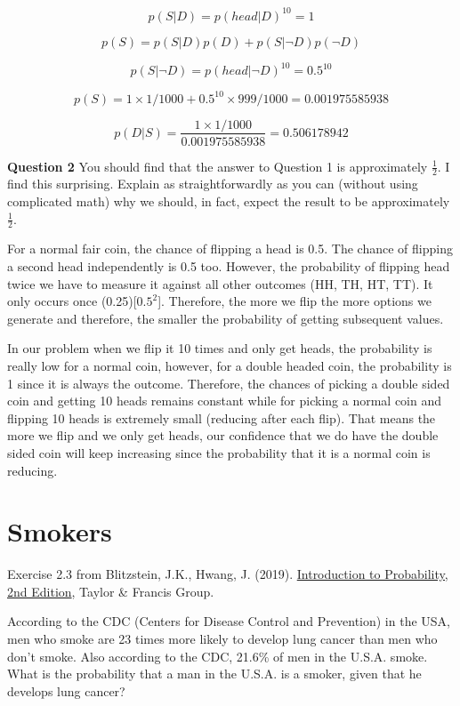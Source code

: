 \documentclass{article}
\begin{document}
$$p(S| D) = p(head | D)^{10} = 1$$

$$p(S) = p(S |D)p(D) + p(S | \neg D)p(\neg D)$$

$$p(S | \neg D) = p(head | \neg D)^{10} = 0.5^{10}$$

$$p(S) = 1 \times 1/1000 + 0.5^{10} \times 999/1000 = 0.001975585938$$

$$p(D | S) = \frac{1 \times 1/1000}{0.001975585938} = 0.506178942$$


\textbf{Question 2} You should find that the answer to Question 1 is approximately $\frac{1}{2}$. I find this surprising. Explain as straightforwardly as you can (without using complicated math) why we should, in fact, expect the result to be approximately $\frac{1}{2}$.

For a normal fair coin, the chance of flipping a head is 0.5. The chance of flipping a second head independently is 0.5 too. However, 
the probability of flipping head twice we have to measure it against all other outcomes (HH, TH, HT, TT). It only occurs once (0.25)[$0.5^{2}$].
Therefore, the more we flip the more options we generate and therefore, the smaller the probability of getting subsequent values.

In our problem when we flip it 10 times and only get heads, the probability is really low for a normal coin, however, for a double headed
coin, the probability is 1 since it is always the outcome. Therefore, the chances of picking a double sided coin and getting 10 heads remains
constant while for picking a normal coin and flipping 10 heads is extremely small (reducing after each flip). That means the more we flip and 
we only get heads, our confidence that we do have the double sided coin will keep increasing since the probability that it is a normal coin
is reducing.

\section{Smokers}

Exercise 2.3 from Blitzstein, J.K., Hwang, J. (2019). \href{https://drive.google.com/file/d/1VmkAAGOYCTORq1wxSQqy255qLJjTNvBI/view}{Introduction to Probability, 2nd Edition}, Taylor \& Francis Group.

According to the CDC (Centers for Disease Control and Prevention) in the USA, men who smoke are 23 times more likely to develop lung cancer than men who don’t smoke. Also according to the CDC, 21.6\% of men in the U.S.A. smoke. What is the probability that a man in the U.S.A. is a smoker, given that he develops lung cancer?
\end{document}
